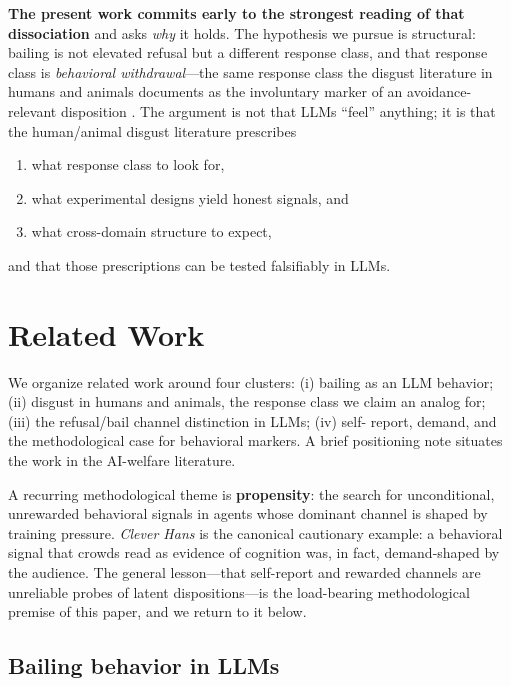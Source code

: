 \documentclass{article}
\begin{document}
\textbf{The present work commits early to the strongest reading of that
dissociation} and asks \emph{why} it holds. The hypothesis we pursue is
structural: bailing is not elevated refusal but a different response class, and
that response class is \emph{behavioral withdrawal}---the same response class
the disgust literature in humans and animals documents as the involuntary
marker of an avoidance-relevant disposition
\citep{schaller2011behavioral,chapman2009taste,grill1978taste}. The argument
is not that LLMs ``feel'' anything; it is that the human/animal disgust
literature prescribes
\begin{enumerate}[leftmargin=*, itemsep=1pt]
    \item what response class to look for,
    \item what experimental designs yield honest signals, and
    \item what cross-domain structure to expect,
\end{enumerate}
\noindent and that those prescriptions can be tested falsifiably in LLMs.


\section{Related Work}

We organize related work around four clusters: (i) bailing as an LLM
behavior; (ii) disgust in humans and animals, the response class we claim an
analog for; (iii) the refusal/bail channel distinction in LLMs; (iv) self-
report, demand, and the methodological case for behavioral markers. A brief
positioning note situates the work in the AI-welfare literature.

A recurring methodological theme is \textbf{propensity}: the search for
unconditional, unrewarded behavioral signals in agents whose dominant channel
is shaped by training pressure. \emph{Clever Hans} is the canonical cautionary
example: a behavioral signal that crowds read as evidence of cognition was, in
fact, demand-shaped by the audience. The general lesson---that self-report
and rewarded channels are unreliable probes of latent dispositions---is the
load-bearing methodological premise of this paper, and we return to it below.

\subsection{Bailing behavior in LLMs}
\end{document}
